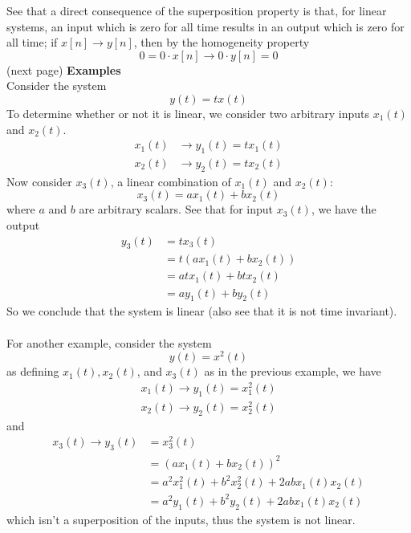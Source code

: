 \documentclass{report}
\begin{document}
See that a direct consequence of the superposition property is that, for linear systems, an input which is zero for all time
results in an output which is zero for all time; if $x[n]\to y[n]$, then by the homogeneity property 
\begin{equation*}
0=0\cdot x[n]\to0\cdot y[n]=0
\end{equation*}
(next page)\newpage
\noindent\textbf{Examples}\\
Consider the system
\begin{equation*}
y(t)=tx(t)
\end{equation*}
To determine whether or not it is linear, we consider two arbitrary inputs $x_1(t)$ and $x_2(t)$.
\begin{align*}
x_1(t)&\to y_1(t)=tx_1(t)\\
x_2(t)&\to y_2(t)=tx_2(t)
\end{align*}
Now consider $x_3(t)$, a linear combination of $x_1(t)$ and $x_2(t)$:
\begin{equation*}
x_3(t)=ax_1(t)+bx_2(t)
\end{equation*}
where $a$ and $b$ are arbitrary scalars. See that for input $x_3(t)$, we have the output
\begin{align*}
y_3(t)&=tx_3(t)\\
&=t(ax_1(t)+bx_2(t))\\
&=atx_1(t)+btx_2(t)\\
&=ay_1(t)+by_2(t)
\end{align*}
So we conclude that the system is linear (also see that it is not time invariant).\\
\vspace{1mm}\\
For another example, consider the system
\begin{equation*}
y(t)=x^2(t)
\end{equation*}
as defining $x_1(t),x_2(t)$, and $x_3(t)$ as in the previous example, we have
\begin{align*}
x_1(t)\to y_1(t)=x^2_1(t)\\
x_2(t)\to y_2(t)=x^2_2(t)
\end{align*}
and 
\begin{align*}
x_3(t)\to y_3(t)&=x^2_3(t)\\
&=(ax_1(t)+bx_2(t))^2\\
&=a^2x^2_1(t)+b^2x^2_2(t)+2abx_1(t)x_2(t)\\
&=a^2y_1(t)+b^2y_2(t)+2abx_1(t)x_2(t)
\end{align*}
which isn't a superposition of the inputs, thus the system is not linear.\\
\end{document}
